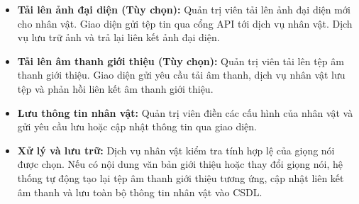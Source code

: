 \begin{itemize}

\item \textbf{Tải lên ảnh đại diện (Tùy chọn):}
Quản trị viên
tải lên ảnh đại diện mới cho nhân vật.
Giao diện gửi tệp tin qua cổng API tới dịch vụ nhân vật.
Dịch vụ lưu trữ ảnh và trả lại liên kết ảnh đại diện.

\item \textbf{Tải lên âm thanh giới thiệu (Tùy chọn):}
Quản trị viên
tải lên tệp âm thanh giới thiệu.
Giao diện gửi yêu cầu tải âm thanh, dịch vụ nhân vật lưu tệp và phản hồi liên kết âm thanh giới thiệu.

\item \textbf{Lưu thông tin nhân vật:}
Quản trị viên
điền các cấu hình của nhân vật và
gửi yêu cầu lưu hoặc cập nhật thông tin qua giao diện.

\item \textbf{Xử lý và lưu trữ:}
Dịch vụ nhân vật kiểm tra tính hợp lệ của giọng nói được chọn.
Nếu có nội dung văn bản giới thiệu hoặc thay đổi giọng nói, hệ thống tự động tạo lại tệp âm thanh giới thiệu tương ứng,
cập nhật liên kết âm thanh và lưu toàn bộ thông tin nhân vật vào CSDL.
\end{itemize}
